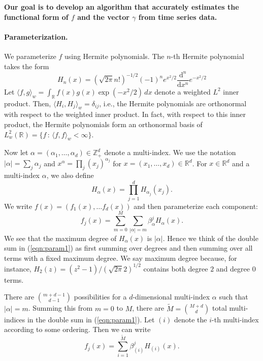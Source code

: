 \documentclass{article}
\begin{document}
\textbf{Our goal is to develop an algorithm that accurately estimates the functional form of $f$ and the vector $\gamma$ from time series data.}

\paragraph{Parameterization.} We parameterize $f$ using Hermite polynomials.  The $n$-th Hermite polynomial takes the form
\begin{equation}
\label{eqn:hermdef}
H_n(x) = (\sqrt{2 \pi} n!)^{-1/2} (-1)^n e^{x^2/2} \dfrac{\mathrm{d}^n}{\mathrm{d}x^n} e^{-x^2/2}
\end{equation}
Let $\langle f, g \rangle_w = \int_{\mathbb{R}} f(x) g(x) \exp(-x^2/2) \, dx$ denote a weighted $L^2$ inner product.  Then, $\langle H_i, H_j \rangle_w = \delta_{ij}$, i.e., the Hermite polynomials are orthonormal with respect to the weighted inner product.  In fact, with respect to this inner product, the Hermite polynomials form an orthonormal basis of $L^2_w(\mathbb{R}) = \{ f \, : \, \langle f, f \rangle_w < \infty \}$.

Now let $\alpha = (\alpha_1, \ldots, \alpha_d) \in \mathbb{Z}^d_+$ denote a multi-index.  We use the notation $|\alpha| = \sum_j \alpha_j$ and $x^\alpha = \prod_j (x_j)^{\alpha_j}$ for $x = (x_1, \ldots, x_d) \in \mathbb{R}^d$.  For $x \in \mathbb{R}^d$ and a multi-index $\alpha$, we also define
\begin{equation}
\label{eqn:hermmultiindex}
H_\alpha(x) = \prod_{j=1}^d H_{\alpha_j}(x_j).
\end{equation}
We write $f(x) = (f_1(x), \ldots f_d(x))$ and then parameterize each component:
\begin{equation}
\label{eqn:param1}
f_j(x) = \sum_{m=0}^M \sum_{|\alpha|=m} \beta^j_\alpha H_\alpha(x).
\end{equation}
We see that the maximum degree of $H_\alpha(x)$ is $|\alpha|$.  Hence we think of the double sum in (\ref{eqn:param1}) as first summing over degrees and then summing over all terms with a fixed maximum degree.  We say maximum degree because, for instance, $H_2(z) = (z^2-1)/(\sqrt{2 \pi} 2)^{1/2}$ contains both degree $2$ and degree $0$ terms.

There are $\binom{m + d - 1}{d-1}$ possibilities for a $d$-dimensional multi-index $\alpha$ such that $|\alpha| = m$.  Summing this from $m=0$ to $M$, there are $\widetilde{M} = \binom{M+d}{d}$ total multi-indices in the double sum in (\ref{eqn:param1}).  Let $(i)$ denote the $i$-th multi-index according to some ordering.  Then we can write
\begin{equation}
\label{eqn:param2}
f_j(x) = \sum_{i=1}^{\widetilde{M}} \beta^j_{(i)} H_{(i)}(x).
\end{equation}
\end{document}
